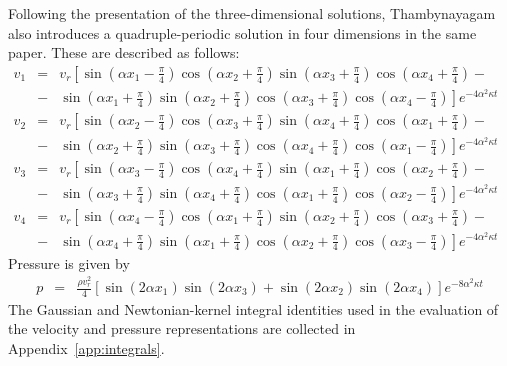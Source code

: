 \documentclass[11pt]{jfm}
\numberwithin{equation}{section}
\begin{document}
Following the presentation of the three-dimensional solutions, Thambynayagam also introduces a quadruple-periodic solution in four dimensions in the same paper. These are described as follows:
\begin{eqnarray}
\label{1.22}
v_1 &=& v_r\left[\sin { \left(\alpha x_1-\frac{\pi}{4} \right) } \cos {\left(\alpha x_2+\frac{\pi}{4}\right) }\sin { \left(\alpha x_3+\frac{\pi}{4}\right) } \cos { \left(\alpha x_4+\frac{\pi}{4} \right) }\right.- \nonumber\\
&-&\left.\sin  {\left( \alpha x_1+\frac{\pi}{4}\right) }\sin  {\left( \alpha x_2+\frac{\pi}{4}\right) } \cos  { \left(\alpha x_3+\frac{\pi}{4} \right) } \cos  {\left( \alpha x_4-\frac{\pi}{4}\right) } \right]e^{ - 4\alpha ^2 \kappa t}\qquad
\end{eqnarray}
\begin{eqnarray}
\label{1.23}
v_2 &=&v_r \left[\sin { \left(\alpha x_2-\frac{\pi}{4} \right) } \cos {\left(\alpha x_3+\frac{\pi}{4}\right) }\sin { \left(\alpha x_4+\frac{\pi}{4}\right) } \cos { \left(\alpha x_1+\frac{\pi}{4} \right) }\right.- \nonumber\\
&-&\left.\sin  {\left( \alpha x_2+\frac{\pi}{4}\right) }\sin  {\left( \alpha x_3+\frac{\pi}{4}\right) } \cos  { \left(\alpha x_4+\frac{\pi}{4} \right) } \cos  {\left( \alpha x_1-\frac{\pi}{4}\right) } \right]e^{ - 4\alpha ^2 \kappa t}\qquad
\end{eqnarray}
\begin{eqnarray}
\label{1.24}
v_3&=&v_r\left[ \sin { \left(\alpha x_3-\frac{\pi}{4} \right) } \cos {\left(\alpha x_4+\frac{\pi}{4}\right) }\sin { \left(\alpha x_1+\frac{\pi}{4}\right) } \cos { \left(\alpha x_2+\frac{\pi}{4} \right) }\right.- \nonumber\\
&-&\left.\sin  {\left( \alpha x_3+\frac{\pi}{4}\right) } \sin  {\left( \alpha x_4+\frac{\pi}{4}\right) } \cos  { \left(\alpha x_1+\frac{\pi}{4} \right) }\cos  {\left( \alpha x_2-\frac{\pi}{4}\right) }\right]e^{ - 4\alpha ^2 \kappa t}\qquad
\end{eqnarray}
\begin{eqnarray}
\label{1.25}
v_4&=&v_r\left[ \sin { \left(\alpha x_4-\frac{\pi}{4} \right) } \cos {\left(\alpha x_1+\frac{\pi}{4}\right) }\sin { \left(\alpha x_2+\frac{\pi}{4}\right) } \cos { \left(\alpha x_3+\frac{\pi}{4} \right) }\right.- \nonumber\\
&-&\left.\sin  {\left( \alpha x_4+\frac{\pi}{4}\right) }\sin  {\left( \alpha x_1+\frac{\pi}{4}\right) }  \cos  { \left(\alpha x_2+\frac{\pi}{4} \right) }\cos  {\left( \alpha x_3-\frac{\pi}{4}\right) } \right]e^{ - 4\alpha ^2 \kappa t}\qquad
\end{eqnarray}
Pressure is given by
\begin{eqnarray}
\label{1.26}
p&=&\frac{\rho {v_r^2} }{4}\left[\sin  { \left(2\alpha x_1 \right) } \sin  {\left( 2\alpha x_3\right) }+\sin  { \left(2\alpha x_2 \right) } \sin  {\left( 2\alpha x_4\right) }\right]e^{ - 8\alpha ^2 \kappa t}
\end{eqnarray}
The Gaussian and Newtonian-kernel integral identities used in the evaluation of the velocity and pressure representations are collected in Appendix~\ref{app:integrals}.
\end{document}
